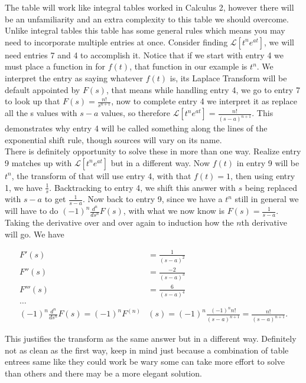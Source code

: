 \documentclass[12pt]{article}
\newcommand{\lp}{\mathscr{L}}
\begin{document}
The table will work like integral tables worked in  Calculus 2, however there will be an unfamiliarity and an extra complexity to this table we should overcome. Unlike integral tables this table has some general rules which means you may need to incorporate multiple entries at once. Consider finding $\lp[t^n e^{at}]$, we will need entries 7 and 4 to accomplish it. Notice that if we start with entry 4 we must place a function in for $f(t)$, that function in our example is $t^n$. We interpret the entry as saying whatever $f(t)$ is, its Laplace Transform will be default appointed by $F(s)$, that means while handling entry 4, we go to entry 7 to look up that $F(s)=\frac{n!}{s^{n+1}}$, now to complete entry 4 we interpret it as replace all the s values with $s-a$ values, so therefore $\lp[t^n e^{at}]=\frac{n!}{(s-a)^{n+1}}$. This demonstrates why entry 4 will be called something along the lines of the exponential shift rule, though sources will vary on its name. \\

There is definitely opportunity to solve these in more than one way. Realize entry 9 matches up with $\lp[t^n e^{at}]$ but in a different way. Now $f(t)$ in entry 9 will be $t^n$, the transform of that will use entry 4, with that $f(t)=1$, then using entry 1, we have $\frac{1}{s}$. Backtracking to entry 4, we shift this answer with $s$ being replaced with $s-a$ to get $\frac{1}{s-a}$. Now back to entry 9, since we have a $t^n$ still in general we will have to do $(-1)^n\frac{d^n}{ds^n}F(s)$, with what we now know is $F(s)=\frac{1}{s-a}$. Taking the derivative over and over again to induction how the $n$th derivative will go. We have

\begin{align*}
    F'(s)&=\frac{1}{(s-a)^2} \\ 
    F''(s)&=\frac{-2}{(s-a)^3} \\ 
    F'''(s)&=\frac{6}{(s-a)^4} \\
    \ldots & \\
    (-1)^n\frac{d^n}{ds^n}F(s)=(-1)^nF^{(n)}&(s)=(-1)^n \frac{(-1)^n n!}{(s-a)^{n+1}}=\frac{n!}{(s-a)^{n+1}}.
\end{align*}

This justifies the transform as the same answer but in a different way. Definitely not as clean as the first way, keep in mind just because a combination of table entrees same like they could work be wary some can take more effort to solve than others and there may be a more elegant solution. \\
\end{document}
